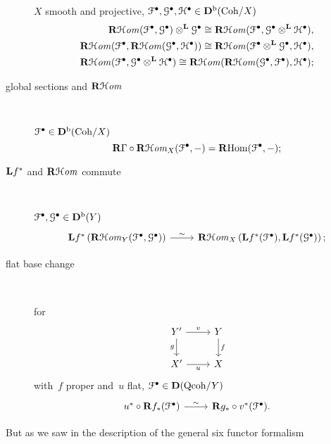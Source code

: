 \documentclass[10pt,a4paper]{article}
\begin{document}
\begin{description}
    $X$ smooth and projective, $\mathcal{F}^\bullet,\mathcal{G}^\bullet,\mathcal{H}^\bullet\in\mathbf{D}^{\mathrm{b}}(\mathrm{Coh}/X)$
    \begin{equation}
      \begin{aligned}
        \operatorname{\mathbf{R}\mathcal{H}\mathit{om}}(\mathcal{F}^\bullet,\mathcal{G}^\bullet)\otimes^{\mathbf{L}}\mathcal{G}^\bullet\cong\operatorname{\mathbf{R}\mathcal{H}\mathit{om}}(\mathcal{F}^\bullet,\mathcal{G}^\bullet\otimes^{\mathbf{L}}\mathcal{H}^\bullet), \\
        \operatorname{\mathbf{R}\mathcal{H}\mathit{om}}(\mathcal{F}^\bullet,\operatorname{\mathbf{R}\mathcal{H}\mathit{om}}(\mathcal{G}^\bullet,\mathcal{H}^\bullet))\cong\operatorname{\mathbf{R}\mathcal{H}\mathit{om}}(\mathcal{F}^\bullet\otimes^{\mathbf{L}}\mathcal{G}^\bullet,\mathcal{H}^\bullet), \\
        \operatorname{\mathbf{R}\mathcal{H}\mathit{om}}(\mathcal{F}^\bullet,\mathcal{G}^\bullet\otimes^{\mathbf{L}}\mathcal{H}^\bullet)\cong\operatorname{\mathbf{R}\mathcal{H}\mathit{om}}(\operatorname{\mathbf{R}\mathcal{H}\mathit{om}}(\mathcal{G}^\bullet,\mathcal{F}^\bullet),\mathcal{H}^\bullet);
      \end{aligned}
    \end{equation}

  \item[global sections and $\operatorname{\mathbf{R}\mathcal{H}\mathit{om}}$] {\ }
    
    $\mathcal{F}^\bullet\in\mathbf{D}^{\mathrm{b}}(\mathrm{Coh}/X)$
    \begin{equation}
      \mathbf{R}\Gamma\circ\operatorname{\mathbf{R}\mathcal{H}\mathit{om}}_X(\mathcal{F}^\bullet,-)=\operatorname{\mathbf{R}Hom}(\mathcal{F}^\bullet,-);
    \end{equation}

  \item[$\mathbf{L} f^*$ and $\operatorname{\mathbf{R}\mathcal{H}\mathit{om}}$ commute] {\ }
    
    $\mathcal{F}^\bullet,\mathcal{G}^\bullet\in\mathbf{D}^{\mathrm{b}}(Y)$
    \begin{equation}
      \begin{tikzcd}
        \LLL f^*\left( \RRRHHom_Y(\mathcal{F}^\bullet,\mathcal{G}^\bullet) \right) \arrow{r}{\sim} & \RRRHHom_X\left( \LLL f^*(\mathcal{F}^\bullet),\LLL f^*(\mathcal{G}^\bullet) \right);
      \end{tikzcd}
    \end{equation}

  \item[flat base change] {\ }

    for
    \begin{equation}
      \begin{tikzcd}
        Y' \arrow[swap]{d}{g} \arrow{r}{v} & Y \arrow{d}{f} \\
        X' \arrow[swap]{r}{u} & X
      \end{tikzcd}
    \end{equation}
    with~$f$ proper and~$u$ flat, $\mathcal{F}^\bullet\in\mathbf{D}(\mathrm{Qcoh}/Y)$
    \begin{equation}
      \begin{tikzcd}
        u^*\circ\RRR f_*(\mathcal{F}^\bullet) \arrow{r}{\sim} & \RRR g_*\circ v^*(\mathcal{F}^\bullet).
      \end{tikzcd}
    \end{equation}
\end{description}
But as we saw in the description of the general six functor formalism\expand
\end{document}

